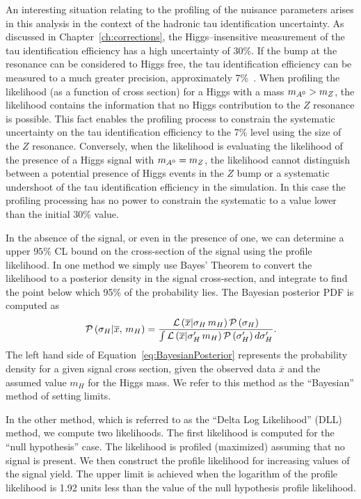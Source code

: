An interesting situation relating to the profiling of the nuisance parameters
arises in this analysis in the context of the hadronic tau identification
uncertainty.  As discussed in Chapter~\ref{ch:corrections}, the
Higgs--insensitive measurement of the tau identification efficiency has a high
uncertainty of 30\%.  If the bump at the \ZTT resonance can be considered to
Higgs free, the tau identification efficiency can be measured to a much greater
precision, approximately 7\%~\cite{CMS-PAS-EWK-10-013, CMS-PAS-TAU-11-001}.
When profiling the likelihood (as a function of cross section) for a Higgs with
a mass $m_{A^0} > m_Z$, the likelihood contains the information that no Higgs
contribution to the $Z$ resonance is possible.  This fact enables the profiling
process to constrain the systematic uncertainty on the tau identification
efficiency to the 7\% level using the size of the $Z$ resonance.  Conversely,
when the likelihood is evaluating the likelihood of the presence of a Higgs
signal with $m_{A^0} = m_Z$, the likelihood cannot distinguish between a potential
presence of Higgs events in the $Z$ bump or a systematic undershoot of the tau
identification efficiency in the simulation.  In this case the profiling
processing has no power to constrain the systematic to a value lower than the
initial 30\% value.

In the absence of the signal, or even in the presence of one, we can
determine a upper $95\%$ CL bound on the cross-section of the signal using
the profile likelihood.  In one method we simply use Bayes' Theorem to
convert the likelihood to a posterior density in the signal
cross-section, and integrate to find the point below which 95\% of the
probability lies.  The Bayesian posterior PDF is computed as
\begin{equation}
  {\cal P}\left( \sigma_H \vert \overline x, \, m_H \right) = 
  \frac
  {{\cal L}\left( \overline x \vert \sigma_{H} \, m_H \right) {\cal P}\left( \sigma_H \right)}
  {\int {\cal L}\left( \overline x \vert \sigma'_H \, m_H\right) {\cal P}\left(
  \sigma'_H \right) d\sigma'_H }.
  \label{eq:BayesianPosterior}
\end{equation}
The left hand side of Equation~\ref{eq:BayesianPosterior} represents the
probability density for a given signal cross section, given the observed data
$\overline x$ and the assumed value $m_H$ for the Higgs mass.  We refer to this
method as the ``Bayesian'' method of setting limits.

In the other method, which is referred to as the ``Delta Log Likelihood'' (DLL)
method, we compute two likelihoods.  The first likelihood is computed for the
``null hypothesis'' case.  The likelihood is profiled (maximized) assuming that
no signal is present.  We then construct the profile likelihood for increasing
values of the signal yield.  The upper limit is achieved when the logarithm of
the profile likelihood is 1.92 units less than the value of the null hypothesis
profile likelihood.  

